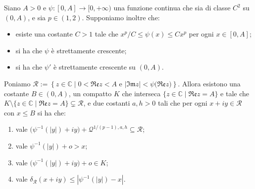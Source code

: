 \begin{lm} \label{psierre}
    Siano $A>0$ e $\psi:[0,A]\longrightarrow[0,+\infty)$ una funzione continua che sia di classe $C^2$ su $(0,A)$, e sia $p\in(1,2)$. Supponiamo inoltre che:
    \begin{itemize}
        \item esiste una costante $C>1$ tale che $x^p/C\le\psi(x)\le Cx^p$ per ogni $x\in[0,A]$;
        \item si ha che $\psi$ è strettamente crescente;
        \item si ha che $\psi'$ è strettamente crescente su $(0,A)$.
    \end{itemize}

    Poniamo $\mathcal{R}:=\left\{z\in\mathbb{C}\mid 0<\mathfrak{Re}z<A\text{ e }|\mathfrak{Im}z|<\psi\bigl(\mathfrak{Re}z\bigr)\right\}$. Allora esistono una costante $B\in(0,A)$, un compatto $K$ che interseca $\{z\in\mathbb{C}\mid\mathfrak{Re}z=A\}$ e tale che $K\setminus\{z\in\mathbb{C}\mid\mathfrak{Re}z=A\}\subsetneq\mathcal{R}$, e due costanti $a,h>0$ tali che per ogni $x+iy\in\mathcal{R}$ con $x\le B$ si ha che:
    \begin{enumerate}[label={(\arabic*)}]
        \item vale $\bigl(\psi^{-1}(|y|)+iy\bigr)+\mathcal{Q}^{1/(p-1),a,h}\subseteq\mathcal{R}$;
        \item vale $\psi^{-1}(|y|)+o>x$;
        \item vale $\bigl(\psi^{-1}(|y|)+iy\bigr)+o\in K$;
        \item vale $\delta_{\mathcal{R}}(x+iy) \le |\psi^{-1}(|y|)-x|$.
    \end{enumerate}
\end{lm}


